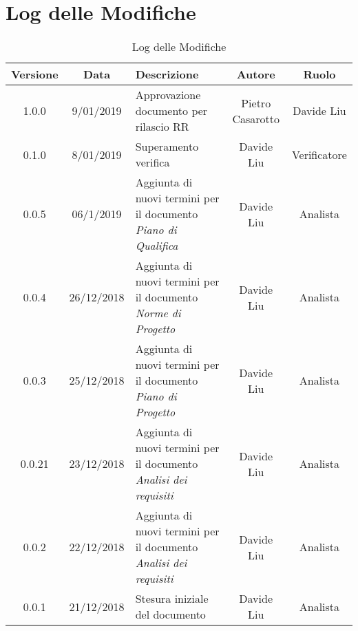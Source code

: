 	\section{Log delle Modifiche}

\begin{table}[!h] %
            \centering
            \renewcommand{\arraystretch}{2}
            \begin{tabular}{|c|c|p{5cm}|c|c|} %
                \rowcolor{orange!50} %
        		\hline
        		\textbf{Versione} & \textbf{Data} & \textbf{Descrizione} & \textbf{Autore} & \textbf{Ruolo} \\
                \hline
                1.0.0 & 9/01/2019 & Approvazione documento per rilascio RR & Pietro Casarotto & Davide Liu \\
                \hline
                0.1.0 & 8/01/2019 & Superamento verifica & Davide Liu & Verificatore \\
                \hline
                0.0.5 & 06/1/2019 & Aggiunta di nuovi termini per il documento \textit{Piano di Qualifica} & Davide Liu & Analista \\
                \hline
                0.0.4 & 26/12/2018 & Aggiunta di nuovi termini per il documento \textit{Norme di Progetto} & Davide Liu & Analista \\
                \hline
                0.0.3 & 25/12/2018 & Aggiunta di nuovi termini per il documento \textit{Piano di Progetto} & Davide Liu & Analista \\
                \hline
                0.0.21 & 23/12/2018 & Aggiunta di nuovi termini per il documento \textit{Analisi dei requisiti} & Davide Liu & Analista \\
                \hline
                0.0.2 & 22/12/2018 & Aggiunta di nuovi termini per il documento \textit{Analisi dei requisiti} & Davide Liu & Analista \\
                \hline
                0.0.1 & 21/12/2018 & Stesura iniziale del documento & Davide Liu & Analista \\
                \hline
                
        \end{tabular}
        \caption{Log delle Modifiche} %
        \label{tab:Log delle modifiche}
\end{table}